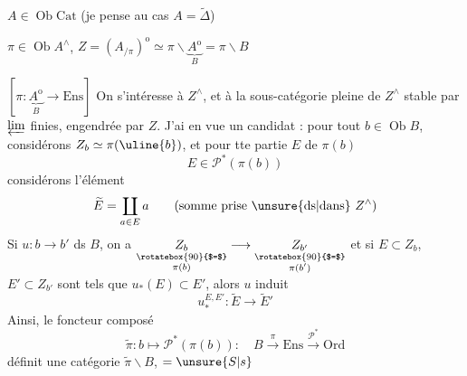 $A\in\operatorname{Ob}\mathrm{Cat}$ (je pense au cas $A=\widetilde\Delta$)

$\pi\in\operatorname{Ob}A^\wedge$, $Z=(A_{/\pi})^{\mathrm o}\simeq\pi\backslash\underbrace{A^{\mathrm o}}_B=\pi\backslash B$

$[\pi:\underbrace{A^{\mathrm o}}_B\longrightarrow\mathrm{Ens}]$ On s'intéresse à $Z^\wedge$, et à la sous-catégorie pleine de $Z^\wedge$  stable par $\varprojlim$ finies, engendrée par $Z$. J'ai en vue un candidat : pour tout $b\in\operatorname{Ob}B$, considérons $Z_b\simeq\pi(\uline{b})$, et pour tte partie  $E$ de $\pi(b)$
\[
 E\in\mathcal P^*(\pi(b))
\]
considérons l'élément
\[
 \widetilde E=\coprod_{a\in E}a\qquad(\text{somme prise \unsure{ds|dans} }Z^\wedge)
\]
Si $u:b\longrightarrow b'$ ds $B$, on a  $\underset{\substack{\rotatebox{90}{$=$}\\\pi(b)}}{Z_b}\longrightarrow\underset{\substack{\rotatebox{90}{$=$}\\\pi(b')}}{Z_{b'}}$ et si $E\subset Z_b$, $E'\subset Z_{b'}$ sont tels que $u_*(E)\subset E'$, alors $u$ induit
\[
 u_*^{E,E'}:\widetilde E\longrightarrow\widetilde E'
\]
Ainsi, le foncteur composé
\[
 \widetilde\pi:b\longmapsto\mathcal P^*(\pi(b)):\quad B\xrightarrow{\pi}\mathrm{Ens}\xrightarrow{\mathcal P^*}\mathrm{Ord}
\]
définit une catégorie $\widetilde\pi\backslash B$,  $=\unsure{S|s}$
